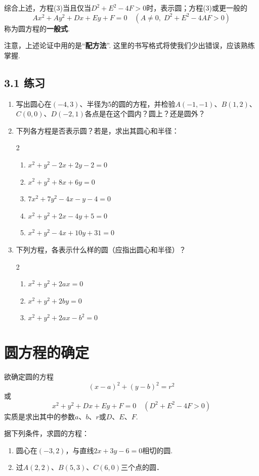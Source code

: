 综合上述，方程(3)当且仅当$D^2+E^2-4F>0$时，表示圆；方程(3)或更一般的
\[Ax^2+Ay^2+Dx+Ey+F=0\quad (A\ne 0,\; D^2+E^2-4AF>0)\]
称为圆方程的\textbf{一般式}.

注意，上述论证中用的是“\textbf{配方法}”. 这里的书写格式将使我们少出错误，应该熟练掌握.

\subsection*{3.1 练习}
\begin{enumerate}
    \item 写出圆心在$(-4,3)$、半径为5的圆的方程，并检验$A(-1,-1)$、$B(1,2)$、$C(0,0)$、$D(-2,1)$各点是在这个圆内？圆上？还是圆外？
    \item 下列各方程是否表示圆？若是，求出其圆心和半径：
    \begin{multicols}{2}
\begin{enumerate}[(1)]
    \item $x^2+y^2-2x+2y-2=0$
    \item $x^2+y^2+8x+6y=0$
    \item $7x^2+7y^2-4x-y-4=0$
    \item $x^2+y^2+2x-4y+5=0$
    \item $x^2+y^2-4x+10y+31=0$
\end{enumerate}
    \end{multicols}

    \item 下列方程，各表示什么样的圆（应指出圆心和半径）？
    \begin{multicols}{2}
    \begin{enumerate}[(1)]
        \item $x^2+y^2+2ax=0$
        \item $x^2+y^2+2by=0$
        \item $x^2+y^2+2ax-b^2=0$
\end{enumerate}
    \end{multicols}
\end{enumerate}

\section{圆方程的确定}
欲确定圆的方程
\[(x-a)^2+(y-b)^2=r^2\]
或
\[x^2+y^2+Dx+Ey+F=0\quad (D^2+E^2-4F>0)\]
实质是求出其中的参数$a$、$b$、$r$或$D$、$E$、$F$.

\begin{example}
    据下列条件，求圆的方程：
\begin{enumerate}[(1)]
\item 圆心在$(-3,2)$，与直线$2x+3y-6=0$相切的圆.
\item 过$A(2,2)$、$B(5,3)$、$C(6,0)$三个点的圆．
\end{enumerate}
\end{example}

